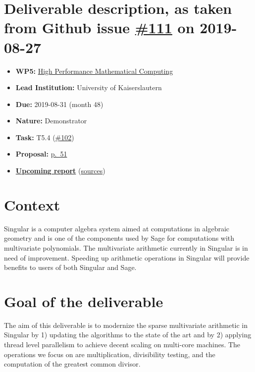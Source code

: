 \section*{\texorpdfstring{Deliverable description, as taken from Github
issue
\href{https://github.com/OpenDreamKit/OpenDreamKit/issues/111}{\#111} on
2019-08-27}{Deliverable description, as taken from Github issue \#111 on 2019-08-27}}\label{deliverable-description-as-taken-from-github-issue-111-on-2019-08-27}

\begin{itemize}
\tightlist
\item
  \textbf{WP5:}
  \href{https://github.com/OpenDreamKit/OpenDreamKit/tree/master/WP5}{High
  Performance Mathematical Computing}
\item
  \textbf{Lead Institution:} University of Kaiserslautern
\item
  \textbf{Due:} 2019-08-31 (month 48)
\item
  \textbf{Nature:} Demonstrator
\item
  \textbf{Task:} T5.4
  (\href{https://github.com/OpenDreamKit/OpenDreamKit/issues/102}{\#102})
\item
  \textbf{Proposal:}
  \href{https://github.com/OpenDreamKit/OpenDreamKit/raw/master/Proposal/proposal-www.pdf}{p.~51}
\item
  \textbf{\href{https://github.com/OpenDreamKit/OpenDreamKit/raw/master/WP5/D5.13/report-final.pdf}{Upcoming
  report}}
  (\href{https://github.com/OpenDreamKit/OpenDreamKit/raw/master/WP5/D5.13/}{sources})
\end{itemize}

\section*{Context}\label{context}

Singular is a computer algebra system aimed at computations in algebraic
geometry and is one of the components used by Sage for computations with
multivariate polynomials. The multivariate arithmetic currently in
Singular is in need of improvement. Speeding up arithmetic operations in
Singular will provide benefits to users of both Singular and Sage.

\section*{Goal of the deliverable}\label{goal-of-the-deliverable}

The aim of this deliverable is to modernize the sparse multivariate
arithmetic in Singular by 1) updating the algorithms to the state of the
art and by 2) applying thread level parallelism to achieve decent
scaling on multi-core machines. The operations we focus on are
multiplication, divisibility testing, and the computation of the
greatest common divisor.
